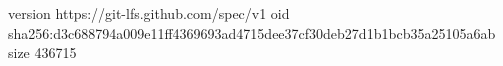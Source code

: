 version https://git-lfs.github.com/spec/v1
oid sha256:d3c688794a009e11ff4369693ad4715dee37cf30deb27d1b1bcb35a25105a6ab
size 436715
